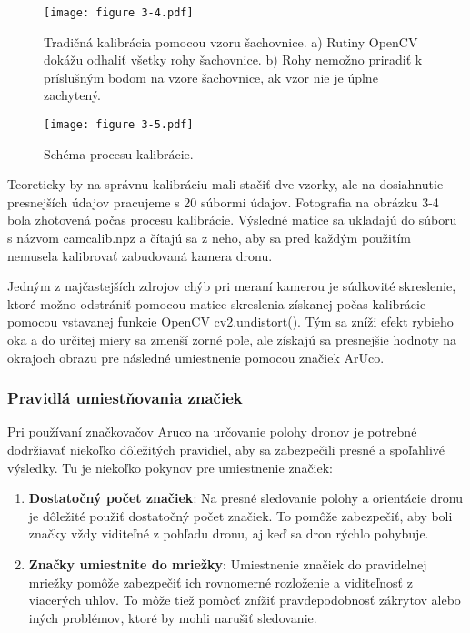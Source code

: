 {\begin{figure}[ht!]
    \centering
    \texttt{[image: figure 3-4.pdf]}
    \caption{Tradičná kalibrácia pomocou vzoru šachovnice. a) Rutiny OpenCV dokážu odhaliť všetky rohy šachovnice. b) Rohy nemožno priradiť k príslušným bodom na vzore šachovnice, ak vzor nie je úplne zachytený.}
    \label{o:3-4}
\end{figure}  

\begin{figure}[ht!]
    \centering
    \texttt{[image: figure 3-5.pdf]}
    \caption{Schéma procesu kalibrácie.}
    \label{o:3-5}
\end{figure}  

Teoreticky by na správnu kalibráciu mali stačiť dve vzorky, ale na dosiahnutie presnejších údajov pracujeme s 20 súbormi údajov. Fotografia na obrázku 3-4 bola zhotovená počas procesu kalibrácie. Výsledné matice sa ukladajú do súboru s názvom camcalib.npz a čítajú sa z neho, aby sa pred každým použitím nemusela kalibrovať zabudovaná kamera dronu. 

Jedným z najčastejších zdrojov chýb pri meraní kamerou je súdkovité skreslenie, ktoré možno odstrániť pomocou matice skreslenia získanej počas kalibrácie pomocou vstavanej funkcie OpenCV cv2.undistort(). Tým sa zníži efekt rybieho oka a do určitej miery sa zmenší zorné pole, ale získajú sa presnejšie hodnoty na okrajoch obrazu pre následné umiestnenie pomocou značiek ArUco.
\subsubsection{Pravidlá umiestňovania značiek}
Pri používaní značkovačov Aruco na určovanie polohy dronov je potrebné dodržiavať niekoľko dôležitých pravidiel, aby sa zabezpečili presné a spoľahlivé výsledky. Tu je niekoľko pokynov pre umiestnenie značiek:
\begin{enumerate}

\item \textbf{Dostatočný počet značiek}: Na presné sledovanie polohy a orientácie dronu je dôležité použiť dostatočný počet značiek. To pomôže zabezpečiť, aby boli značky vždy viditeľné z pohľadu dronu, aj keď sa dron rýchlo pohybuje.

\item \textbf{Značky umiestnite do mriežky}: Umiestnenie značiek do pravidelnej mriežky pomôže zabezpečiť ich rovnomerné rozloženie a viditeľnosť z viacerých uhlov. To môže tiež pomôcť znížiť pravdepodobnosť zákrytov alebo iných problémov, ktoré by mohli narušiť sledovanie.


\end{enumerate}}
